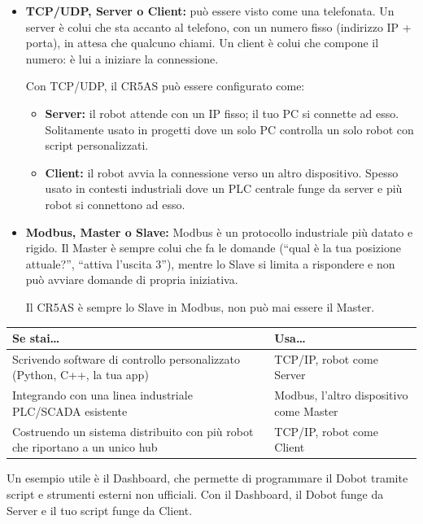 \documentclass[11pt,a4paper]{article}
\begin{document}
\begin{itemize}[leftmargin=1.2cm]
    \item \textbf{TCP/UDP, Server o Client:} può essere visto come una telefonata. Un server è colui che sta accanto al telefono, con un numero fisso (indirizzo IP + porta), in attesa che qualcuno chiami. Un client è colui che compone il numero: è lui a iniziare la connessione.

    Con TCP/UDP, il CR5AS può essere configurato come:
    \begin{itemize}
        \item \textbf{Server:} il robot attende con un IP fisso; il tuo PC si connette ad esso. Solitamente usato in progetti dove un solo PC controlla un solo robot con script personalizzati.
        \item \textbf{Client:} il robot avvia la connessione verso un altro dispositivo. Spesso usato in contesti industriali dove un PLC centrale funge da server e più robot si connettono ad esso.
    \end{itemize}

    \item \textbf{Modbus, Master o Slave:} Modbus è un protocollo industriale più datato e rigido. Il Master è sempre colui che fa le domande (``qual è la tua posizione attuale?'', ``attiva l'uscita 3''), mentre lo Slave si limita a rispondere e non può avviare domande di propria iniziativa.

    Il CR5AS è sempre lo Slave in Modbus, non può mai essere il Master.
\end{itemize}

\begin{longtable}{@{}p{7cm}p{7cm}@{}}
\toprule
\textbf{Se stai\ldots} & \textbf{Usa\ldots} \\
\midrule
\endhead
Scrivendo software di controllo personalizzato (Python, C++, la tua app) & TCP/IP, robot come Server \\ \midrule
Integrando con una linea industriale PLC/SCADA esistente & Modbus, l'altro dispositivo come Master \\ \midrule
Costruendo un sistema distribuito con più robot che riportano a un unico hub & TCP/IP, robot come Client \\
\bottomrule
\end{longtable}

Un esempio utile è il Dashboard, che permette di programmare il Dobot tramite script e strumenti esterni non ufficiali. Con il Dashboard, il Dobot funge da Server e il tuo script funge da Client.
\end{document}
